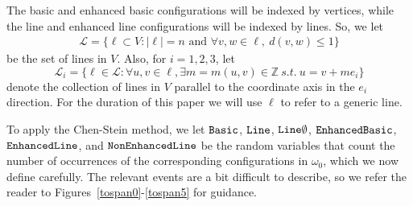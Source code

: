 \documentclass{amsart}
\newcommand{\vect}[1]{{ #1}}
\newcommand{\abs}[1]{\left|#1\right|}
\newcommand{\basic}{\operatorname{\tt Basic}}
\newcommand{\lin}{\operatorname{\tt Line}}
\newcommand{\oline}{\operatorname{\tt  Line\emptyset}}
\newcommand{\eline}{\operatorname{\tt Enhanced Line}}
\newcommand{\ebasic}{\operatorname{\tt Enhanced Basic}}
\newcommand{\neline}{\operatorname{\tt NonEnhancedLine}}
\numberwithin{equation}{section}
\newcommand{\lineset}{\mathscr{L}}
\newcommand{\Ln}{\ell}
\theoremstyle{definition}
\theoremstyle{remark}
\begin{document}
The basic and enhanced basic configurations will be indexed by vertices, while the line and enhanced line configurations will be indexed by lines.  So, we let
\begin{align*}
\lineset = \{\Ln \subset V: \abs{\Ln} = n \text{ and } \forall \vect{v},\vect{w}\in \Ln,\ d(\vect{v}, \vect{w}) \leq 1 \}
\end{align*}
be the set of lines in $V$.  Also, for $i=1,2,3$, let
\begin{equation*}
\lineset_i = \{\Ln\in \lineset: \forall \vect{u},\vect{v}\in \Ln, \exists m = m(\vect{u},\vect{v}) \in \mathbb{Z} \ s.t. \ \vect{u} = \vect{v} + m \vect{e_i} \}
\end{equation*}
denote the collection of lines in $V$ parallel to the coordinate axis in the $\vect{e_i}$ direction.  For the duration of this paper we will use $\Ln$ to refer to a generic line.

To apply the Chen-Stein method, we let $\basic$, $\lin$, $\oline$, $\ebasic$, $\eline$, and $\neline$ be the random variables that count the number of occurrences of the corresponding configurations in $\omega_0$, which we now define carefully.  The relevant events are a bit difficult to describe, so we refer the reader to Figures~\ref{tospan0}-\ref{tospan5} for guidance.
\end{document}
